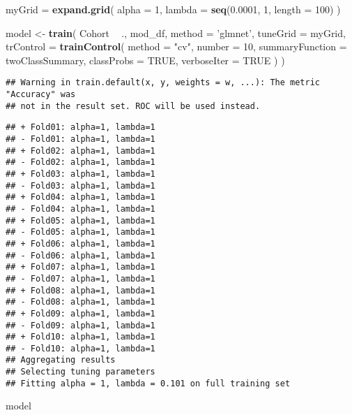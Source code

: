 \documentclass[]{article}
\newenvironment{Shaded}{\begin{snugshade}}{\end{snugshade}}
\newcommand{\KeywordTok}[1]{\textcolor[rgb]{0.13,0.29,0.53}{\textbf{#1}}}
\newcommand{\DataTypeTok}[1]{\textcolor[rgb]{0.13,0.29,0.53}{#1}}
\newcommand{\DecValTok}[1]{\textcolor[rgb]{0.00,0.00,0.81}{#1}}
\newcommand{\FloatTok}[1]{\textcolor[rgb]{0.00,0.00,0.81}{#1}}
\newcommand{\StringTok}[1]{\textcolor[rgb]{0.31,0.60,0.02}{#1}}
\newcommand{\OtherTok}[1]{\textcolor[rgb]{0.56,0.35,0.01}{#1}}
\newcommand{\OperatorTok}[1]{\textcolor[rgb]{0.81,0.36,0.00}{\textbf{#1}}}
\newcommand{\NormalTok}[1]{#1}
\begin{document}
\begin{Shaded}
\begin{Highlighting}[]
\NormalTok{myGrid =}\StringTok{ }\KeywordTok{expand.grid}\NormalTok{(}
  \DataTypeTok{alpha =} \DecValTok{1}\NormalTok{,}
  \DataTypeTok{lambda =} \KeywordTok{seq}\NormalTok{(}\FloatTok{0.0001}\NormalTok{, }\DecValTok{1}\NormalTok{, }\DataTypeTok{length =} \DecValTok{100}\NormalTok{)}
\NormalTok{)}

\NormalTok{model <-}\StringTok{ }\KeywordTok{train}\NormalTok{(}
\NormalTok{  Cohort }\OperatorTok{~}\StringTok{ }\NormalTok{., }
\NormalTok{  mod_df, }
  \DataTypeTok{method =} \StringTok{'glmnet'}\NormalTok{,}
  \DataTypeTok{tuneGrid =}\NormalTok{ myGrid,}
  \DataTypeTok{trControl =} \KeywordTok{trainControl}\NormalTok{(}
    \DataTypeTok{method =} \StringTok{"cv"}\NormalTok{,}
    \DataTypeTok{number =} \DecValTok{10}\NormalTok{,}
    \DataTypeTok{summaryFunction =}\NormalTok{ twoClassSummary,}
    \DataTypeTok{classProbs =} \OtherTok{TRUE}\NormalTok{,}
    \DataTypeTok{verboseIter =} \OtherTok{TRUE}
\NormalTok{  )}
\NormalTok{)}
\end{Highlighting}
\end{Shaded}

\begin{verbatim}
## Warning in train.default(x, y, weights = w, ...): The metric "Accuracy" was
## not in the result set. ROC will be used instead.
\end{verbatim}

\begin{verbatim}
## + Fold01: alpha=1, lambda=1 
## - Fold01: alpha=1, lambda=1 
## + Fold02: alpha=1, lambda=1 
## - Fold02: alpha=1, lambda=1 
## + Fold03: alpha=1, lambda=1 
## - Fold03: alpha=1, lambda=1 
## + Fold04: alpha=1, lambda=1 
## - Fold04: alpha=1, lambda=1 
## + Fold05: alpha=1, lambda=1 
## - Fold05: alpha=1, lambda=1 
## + Fold06: alpha=1, lambda=1 
## - Fold06: alpha=1, lambda=1 
## + Fold07: alpha=1, lambda=1 
## - Fold07: alpha=1, lambda=1 
## + Fold08: alpha=1, lambda=1 
## - Fold08: alpha=1, lambda=1 
## + Fold09: alpha=1, lambda=1 
## - Fold09: alpha=1, lambda=1 
## + Fold10: alpha=1, lambda=1 
## - Fold10: alpha=1, lambda=1 
## Aggregating results
## Selecting tuning parameters
## Fitting alpha = 1, lambda = 0.101 on full training set
\end{verbatim}

\begin{Shaded}
\begin{Highlighting}[]
\NormalTok{model}
\end{Highlighting}
\end{Shaded}
\end{document}
